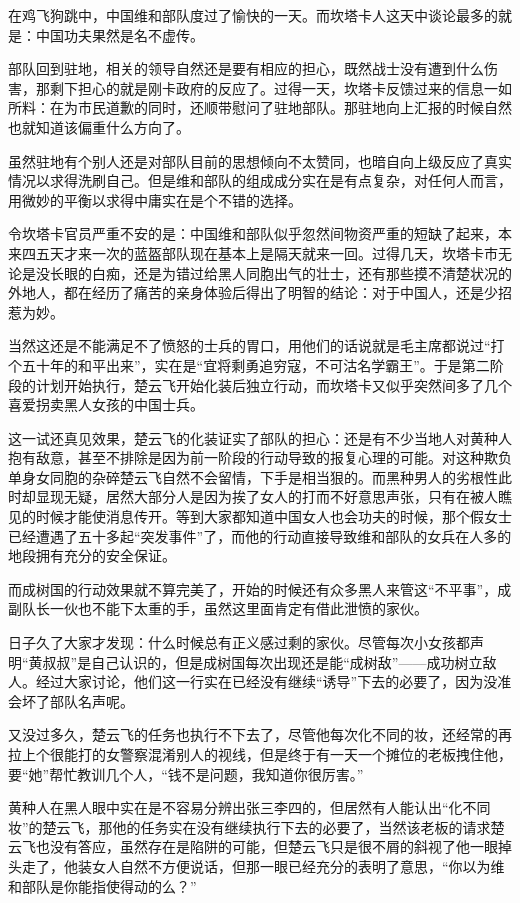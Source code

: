 在鸡飞狗跳中，中国维和部队度过了愉快的一天。而坎塔卡人这天中谈论最多的就是：中国功夫果然是名不虚传。

部队回到驻地，相关的领导自然还是要有相应的担心，既然战士没有遭到什么伤害，那剩下担心的就是刚卡政府的反应了。过得一天，坎塔卡反馈过来的信息一如所料：在为市民道歉的同时，还顺带慰问了驻地部队。那驻地向上汇报的时候自然也就知道该偏重什么方向了。

虽然驻地有个别人还是对部队目前的思想倾向不太赞同，也暗自向上级反应了真实情况以求得洗刷自己。但是维和部队的组成成分实在是有点复杂，对任何人而言，用微妙的平衡以求得中庸实在是个不错的选择。

令坎塔卡官员严重不安的是：中国维和部队似乎忽然间物资严重的短缺了起来，本来四五天才来一次的蓝盔部队现在基本上是隔天就来一回。过得几天，坎塔卡市无论是没长眼的白痴，还是为错过给黑人同胞出气的壮士，还有那些摸不清楚状况的外地人，都在经历了痛苦的亲身体验后得出了明智的结论：对于中国人，还是少招惹为妙。

当然这还是不能满足不了愤怒的士兵的胃口，用他们的话说就是毛主席都说过“打个五十年的和平出来”，实在是“宜将剩勇追穷寇，不可沽名学霸王”。于是第二阶段的计划开始执行，楚云飞开始化装后独立行动，而坎塔卡又似乎突然间多了几个喜爱拐卖黑人女孩的中国士兵。

这一试还真见效果，楚云飞的化装证实了部队的担心：还是有不少当地人对黄种人抱有敌意，甚至不排除是因为前一阶段的行动导致的报复心理的可能。对这种欺负单身女同胞的杂碎楚云飞自然不会留情，下手是相当狠的。而黑种男人的劣根性此时却显现无疑，居然大部分人是因为挨了女人的打而不好意思声张，只有在被人瞧见的时候才能使消息传开。等到大家都知道中国女人也会功夫的时候，那个假女士已经遭遇了五十多起“突发事件”了，而他的行动直接导致维和部队的女兵在人多的地段拥有充分的安全保证。

而成树国的行动效果就不算完美了，开始的时候还有众多黑人来管这“不平事”，成副队长一伙也不能下太重的手，虽然这里面肯定有借此泄愤的家伙。

日子久了大家才发现：什么时候总有正义感过剩的家伙。尽管每次小女孩都声明“黄叔叔”是自己认识的，但是成树国每次出现还是能“成树敌”——成功树立敌人。经过大家讨论，他们这一行实在已经没有继续“诱导”下去的必要了，因为没准会坏了部队名声呢。

又没过多久，楚云飞的任务也执行不下去了，尽管他每次化不同的妆，还经常的再拉上个很能打的女警察混淆别人的视线，但是终于有一天一个摊位的老板拽住他，要“她”帮忙教训几个人，“钱不是问题，我知道你很厉害。”

黄种人在黑人眼中实在是不容易分辨出张三李四的，但居然有人能认出“化不同妆”的楚云飞，那他的任务实在没有继续执行下去的必要了，当然该老板的请求楚云飞也没有答应，虽然存在是陷阱的可能，但楚云飞只是很不屑的斜视了他一眼掉头走了，他装女人自然不方便说话，但那一眼已经充分的表明了意思，“你以为维和部队是你能指使得动的么？”

